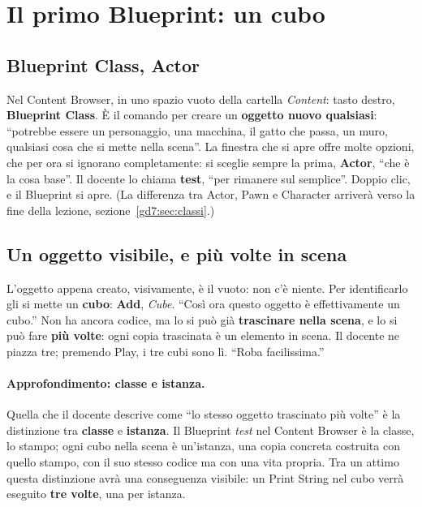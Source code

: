 \section{Il primo Blueprint: un cubo}
\label{gd7:sec:primo-blueprint}

\subsection{Blueprint Class, Actor}

Nel Content Browser, in uno spazio vuoto della cartella \emph{Content}: tasto
destro, \textbf{Blueprint Class}. È il comando per creare un \textbf{oggetto
nuovo qualsiasi}: ``potrebbe essere un personaggio, una macchina, il gatto che
passa, un muro, qualsiasi cosa che si mette nella scena''. La finestra che si
apre offre molte opzioni, che per ora si ignorano completamente: si sceglie
sempre la prima, \textbf{Actor}, ``che è la cosa base''. Il docente lo chiama
\textbf{test}, ``per rimanere sul semplice''. Doppio clic, e il Blueprint si
apre. (La differenza tra Actor, Pawn e Character arriverà verso la fine della
lezione, sezione~\ref{gd7:sec:classi}.)

\subsection{Un oggetto visibile, e più volte in scena}

L'oggetto appena creato, visivamente, è il vuoto: non c'è niente. Per
identificarlo gli si mette un \textbf{cubo}: \textbf{Add}, \emph{Cube}. ``Così
ora questo oggetto è effettivamente un cubo.'' Non ha ancora codice, ma lo si
può già \textbf{trascinare nella scena}, e lo si può fare \textbf{più volte}:
ogni copia trascinata è un elemento in scena. Il docente ne piazza tre; premendo
Play, i tre cubi sono lì. ``Roba facilissima.''

\paragraph{Approfondimento: classe e istanza.} Quella che il docente descrive
come ``lo stesso oggetto trascinato più volte'' è la distinzione tra
\textbf{classe} e \textbf{istanza}. Il Blueprint \emph{test} nel Content
Browser è la classe, lo stampo; ogni cubo nella scena è un'istanza, una copia
concreta costruita con quello stampo, con il suo stesso codice ma con una vita
propria. Tra un attimo questa distinzione avrà una conseguenza visibile: un
Print String nel cubo verrà eseguito \textbf{tre volte}, una per istanza.

